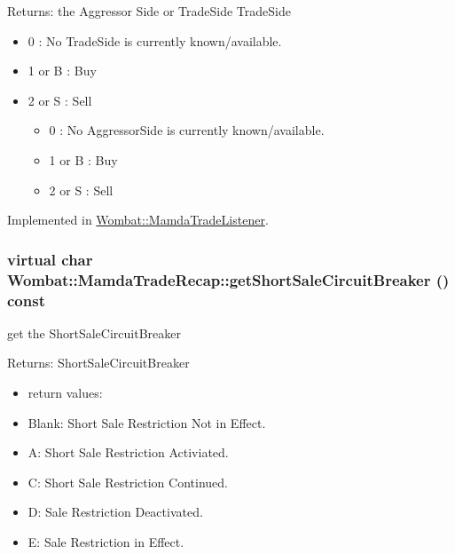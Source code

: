 \begin{Desc}
\item[Returns:]the Aggressor Side or Trade\-Side Trade\-Side \begin{itemize}
\item 0 : No Trade\-Side is currently known/available. \item 1 or B : Buy \item 2 or S : Sell \begin{itemize}
\end{itemize}
\begin{itemize}
\item 0 : No Aggressor\-Side is currently known/available. \item 1 or B : Buy \item 2 or S : Sell \begin{itemize}
\end{itemize}
\end{itemize}
\end{itemize}
\end{Desc}


Implemented in \hyperlink{classWombat_1_1MamdaTradeListener_e3cca817a27a4e6b9e5b699f548cd22a}{Wombat::Mamda\-Trade\-Listener}.\hypertarget{classWombat_1_1MamdaTradeRecap_8fffec973ff9978944e72d9438c6a1cd}{
\subsubsection[getShortSaleCircuitBreaker]{\setlength{\rightskip}{0pt plus 5cm}virtual char Wombat::Mamda\-Trade\-Recap::get\-Short\-Sale\-Circuit\-Breaker () const}}
\label{classWombat_1_1MamdaTradeRecap_8fffec973ff9978944e72d9438c6a1cd}


get the Short\-Sale\-Circuit\-Breaker 

\begin{Desc}
\item[Returns:]Short\-Sale\-Circuit\-Breaker \begin{itemize}
\item return values: \item Blank: Short Sale Restriction Not in Effect. \item A: Short Sale Restriction Activiated. \item C: Short Sale Restriction Continued. \item D: Sale Restriction Deactivated. \item E: Sale Restriction in Effect. \end{itemize}
\end{Desc}


